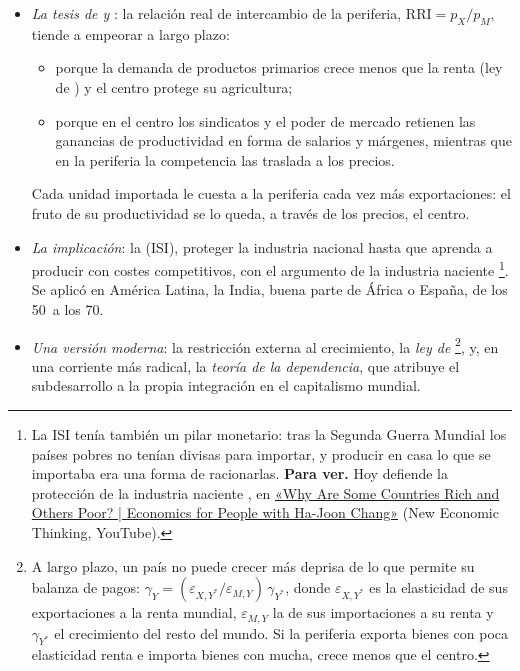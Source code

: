 \documentclass[11pt]{article}
\begin{document}
\begin{itemize}
\item \emph{La tesis de  y }: la relación real de intercambio de la periferia, $\mathrm{RRI}=p_X/p_M$, tiende a empeorar a largo plazo:
  \begin{itemize}
  \item porque la demanda de productos primarios crece menos que la renta (ley de ) y el centro protege su agricultura;
  \item porque en el centro los sindicatos y el poder de mercado retienen las ganancias de productividad en forma de salarios y márgenes, mientras que en la periferia la competencia las traslada a los precios.
  \end{itemize}
  Cada unidad importada le cuesta a la periferia cada vez más exportaciones: el fruto de su productividad se lo queda, a través de los precios, el centro.
\item \emph{La implicación}: la  (ISI), proteger la industria nacional hasta que aprenda a producir con costes competitivos, con el argumento de la industria naciente \footnote{La ISI tenía también un pilar monetario: tras la Segunda Guerra Mundial los países pobres no tenían divisas para importar, y producir en casa lo que se importaba era una forma de racionarlas\nocite{Irwin2021}. \textbf{Para ver.} Hoy defiende la protección de la industria naciente , en \href{https://www.youtube.com/watch?v=mi49GjJOPm0}{«Why Are Some Countries Rich and Others Poor? | Economics for People with Ha-Joon Chang»} (New Economic Thinking, YouTube).}. Se aplicó en América Latina, la India, buena parte de África o España, de los 50~a los 70.
\item \emph{Una versión moderna}: la restricción externa al crecimiento, la \emph{ley de }\footnote{A largo plazo, un país no puede crecer más deprisa de lo que permite su balanza de pagos: $\gamma_Y=(\varepsilon_{X,Y^*}/\varepsilon_{M,Y})\,\gamma_{Y^*}$, donde $\varepsilon_{X,Y^*}$ es la elasticidad de sus exportaciones a la renta mundial, $\varepsilon_{M,Y}$ la de sus importaciones a su renta y $\gamma_{Y^*}$ el crecimiento del resto del mundo\nocite{Thirlwall1979}. Si la periferia exporta bienes con poca elasticidad renta e importa bienes con mucha, crece menos que el centro.}, y, en una corriente más radical, la \emph{teoría de la dependencia}, que atribuye el subdesarrollo a la propia integración en el capitalismo mundial\nocite{Frank1967,CardosoFaletto1969}.
\end{itemize}
\end{document}
